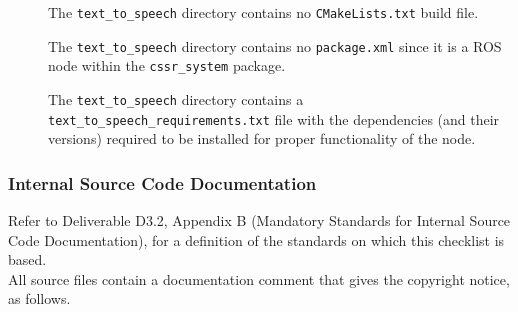 \documentclass{CSSRforAfrica}
\newcommand{\checkboxChecked}{\fbox{\ding{51}}} %
\begin{document}
\begin{description}
\item[\checkboxChecked] The {\small \verb+text_to_speech+} directory contains no {\small \verb+CMakeLists.txt+} build file.

\item[\checkboxChecked] The {\small \verb+text_to_speech+} directory contains no {\small \verb+package.xml+} since it is a ROS node within the {\small \verb+cssr_system+} package.

\item[\checkboxChecked] The {\small \verb+text_to_speech+} directory contains a {{\small \texttt{text\_to\_speech\_requirements.txt}}} file with  the dependencies (and their versions) required to be installed for proper functionality of the node.

\end{description}

\subsubsection{Internal Source Code Documentation}

Refer to Deliverable D3.2, Appendix B (Mandatory Standards for Internal Source Code Documentation), for a definition of the standards on which this checklist is based.\\

\noindent All source files contain a documentation comment that gives the copyright notice, as follows.
\end{document}
